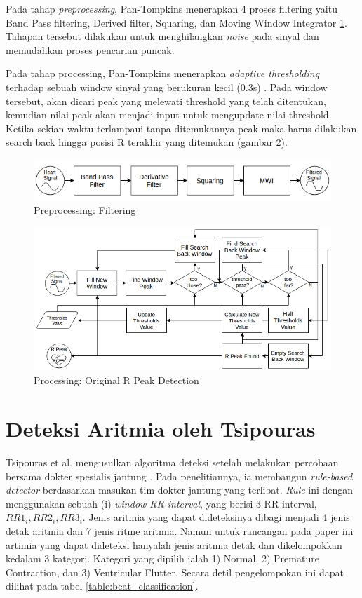 Pada tahap \textit{preprocessing}, Pan-Tompkins menerapkan 4 proses filtering yaitu Band Pass filtering, Derived filter, Squaring, dan Moving Window Integrator \ref{fig:preprocessing}. Tahapan tersebut dilakukan untuk menghilangkan \textit{noise} pada sinyal dan memudahkan proses pencarian puncak. 

Pada tahap processing, Pan-Tompkins menerapkan \textit{adaptive thresholding} terhadap sebuah window sinyal yang berukuran kecil (0.3s) \cite{pantom}. Pada window tersebut, akan dicari peak yang melewati threshold yang telah ditentukan, kemudian nilai peak akan menjadi input untuk  mengupdate nilai threshold. Ketika sekian waktu terlampaui tanpa ditemukannya peak maka harus dilakukan search back hingga posisi R terakhir yang ditemukan (gambar \ref{fig:processing_ori}).

\begin{figure}[htbp]
\centerline{\includegraphics[scale=0.65]{images/preprocessing.png}}
\caption{Preprocessing: Filtering}
\label{fig:preprocessing}
\end{figure}

\begin{figure}[htbp]
\centerline{\includegraphics[scale=0.6]{images/processing_ori.png}}
\caption{Processing: Original R Peak Detection}
\label{fig:processing_ori}
\end{figure}

\section{Deteksi Aritmia oleh Tsipouras}\label{bab2_tsipouras}
Tsipouras et al. mengusulkan algoritma deteksi setelah melakukan percobaan bersama dokter spesialis jantung \cite{rr_classification}. Pada penelitiannya, ia membangun \textit{rule-based detector} berdasarkan masukan tim dokter jantung yang terlibat. \textit{Rule} ini dengan menggunakan sebuah (i) \textit{window RR-interval}, yang berisi 3 RR-interval, $RR1_i, RR2_i, RR3_i$. Jenis aritmia yang dapat dideteksinya dibagi menjadi 4 jenis detak aritmia dan 7 jenis ritme aritmia. Namun untuk rancangan pada paper ini artimia yang dapat dideteksi hanyalah jenis aritmia detak dan dikelompokkan kedalam 3 kategori. Kategori yang dipilih ialah 1) Normal, 2) Premature Contraction, dan 3) Ventricular Flutter. Secara detil pengelompokan ini dapat dilihat pada tabel \ref{table:beat_classification}.

